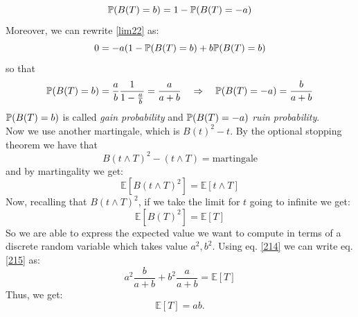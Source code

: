 \begin{example}{}{}{}
\begin{equation}
        \mathbb{P}(B(T)=b) = 1 - \mathbb{P}(B(T)=-a)
    \end{equation}
    Moreover, we can rewrite \eqref{lim22} as:
    \begin{equation}
        0 = -a(1-\mathbb{P}(B(T)=b) + b\mathbb{P}(B(T)=b)
    \end{equation}
    so that 
    \begin{equation}\label{214}
        \mathbb{P}(B(T)=b) = \frac{a}{b}\frac{1}{1-\frac{a}{b}} = \frac{a}{a+b} \quad\Rightarrow\quad \mathbb{P}(B(T)=-a) = \frac{b}{a+b}
    \end{equation}
    $\mathbb{P}(B(T)=b)$ is called \emph{gain probability} and $\mathbb{P}(B(T)=-a)$ \emph{ruin probability}. \\
    Now we use another martingale, which is $B(t)^2 - t$. By the optional stopping theorem we have that 
    \begin{equation}
        B(t\wedge T)^2 - (t\wedge T) = \text{martingale}
    \end{equation}
    and by martingality we get:
    \begin{equation}
        \mathbb{E}[B(t\wedge T)^2] = \mathbb{E}[t\wedge T]
    \end{equation}
    Now, recalling that $B(t\wedge T)^2$, if we take the limit for $t$ going to infinite we get:
    \begin{equation}\label{215}
        \mathbb{E}[B(T)^2] = \mathbb{E}[T]
    \end{equation}
    So we are able to express the expected value we want to compute in terms of a discrete random variable which takes value $a^2,b^2$. Using eq. \eqref{214} we can write eq. \eqref{215} as:
    \begin{equation}
        a^2\frac{b}{a+b} + b^2\frac{a}{a+b} = \mathbb{E}[T]
    \end{equation}
    Thus, we get:
    \begin{equation}
        \mathbb{E}[T] = ab.
    \end{equation}
\end{example}

